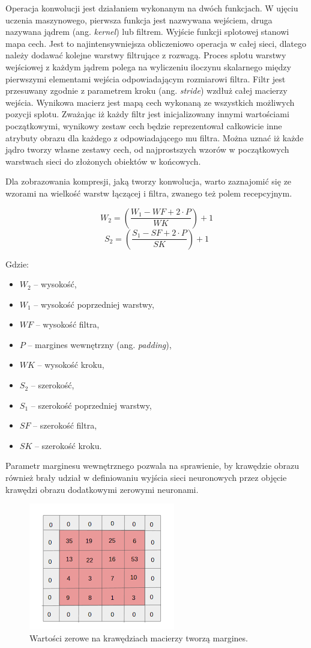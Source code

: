 \documentclass[12pt,a4paper,twoside,titlepage,openright]{book}
\begin{document}
Operacja konwolucji jest działaniem wykonanym na dwóch funkcjach. W ujęciu uczenia maszynowego, pierwsza funkcja jest nazwywana wejściem, druga nazywana jądrem (ang. \textit{kernel}) lub filtrem. Wyjście funkcji splotowej stanowi mapa cech. Jest to najintensywniejsza obliczeniowo operacja w całej sieci, dlatego należy dodawać kolejne warstwy filtrujące z rozwagą. Proces splotu warstwy wejściowej z każdym jądrem polega na wyliczeniu iloczynu skalarnego między pierwszymi elementami wejścia odpowiadającym rozmiarowi filtra. Filtr jest przesuwany zgodnie z parametrem kroku (ang. \textit{stride}) wzdłuż całej macierzy wejścia. Wynikowa macierz jest mapą cech wykonaną ze wszystkich możliwych pozycji splotu. Zważając iż każdy filtr jest inicjalizowany innymi wartościami początkowymi, wynikowy zestaw cech będzie reprezentował całkowicie inne atrybuty obrazu dla każdego z odpowiadającego mu filtra. Można uznać iż każde jądro tworzy własne zestawy cech, od najprostszych wzorów w początkowych warstwach sieci do złożonych obiektów w końcowych.

Dla zobrazowania kompresji, jaką tworzy konwolucja, warto zaznajomić się ze wzorami na wielkość warstw łączącej i filtra, zwanego też polem recepcyjnym.


$$ W_2 = (\frac{W_1 - WF + 2 \cdot P}{WK}) + 1 $$ 
$$ S_2 = (\frac{S_1 - SF + 2 \cdot P}{SK}) + 1 $$


Gdzie:
\begin{itemize}
\item $W_2$ -- wysokość,
\item $W_1$ -- wysokość poprzedniej warstwy,
\item $WF$ -- wysokość filtra,
\item $P$ -- margines wewnętrzny (ang. \textit{padding}),
\item $WK$ -- wysokość kroku,
\item $S_2$ -- szerokość,
\item $S_1$ -- szerokość poprzedniej warstwy,
\item $SF$ -- szerokość filtra,
\item $SK$ -- szerokość kroku.
\end{itemize}

Parametr marginesu wewnętrznego pozwala na sprawienie, by krawędzie obrazu również brały udział w definiowaniu wyjścia sieci neuronowych przez objęcie krawędzi obrazu dodatkowymi zerowymi neuronami. 

\begin{figure}[ht]
	\centering
			\includegraphics[resolution=100]{Padding.png}
		\caption{Wartości zerowe na krawędziach macierzy tworzą margines.}
\end{figure}
\end{document}
